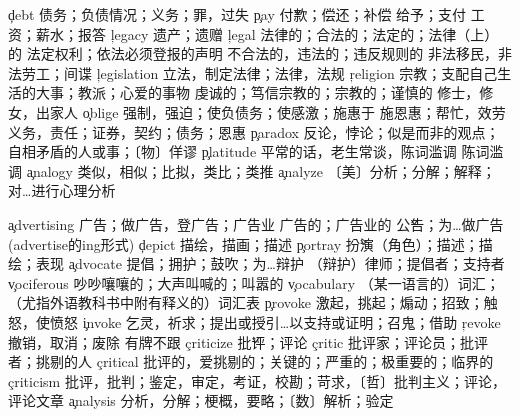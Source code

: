 \begin{multicols}{2}
\c{debt}  \n 债务；负债情况；义务；罪，过失
\c{pay}  \v 付款；偿还；补偿 \vt 给予；支付 \n 工资；薪水；报答
\c{legacy}  \n 遗产；遗赠
\c{legal}  \a 法律的；合法的；法定的；法律（上）的 \n 法定权利；依法必须登报的声明
  \a 不合法的，违法的；违反规则的 \n 非法移民，非法劳工；间谍
\c{legislation}  \n 立法，制定法律；法律，法规
\c{religion}  \n 宗教；支配自己生活的大事；教派；心爱的事物
  \a 虔诚的；笃信宗教的；宗教的；谨慎的 \n 修士，修女，出家人
\c{oblige}  \vt 强制，强迫；使负债务；使感激；施惠于 \vi 施恩惠；帮忙，效劳
  \n 义务，责任；证券，契约；债务；恩惠
\c{paradox}  \n 反论，悖论；似是而非的观点；自相矛盾的人或事；〔物〕佯谬
\c{platitude}  \n 平常的话，老生常谈，陈词滥调
  \n 陈词滥调
\c{analogy}  \n 类似，相似；比拟，类比；类推
\c{analyze}  \vt 〔美〕分析；分解；解释；对…进行心理分析


\c{advertising}  \n 广告；做广告，登广告；广告业 \a 广告的；广告业的 \v 公告；为…做广告(advertise的ing形式)
\c{depict}  \vt 描绘，描画；描述
\c{portray}  \v 扮演（角色）；描述；描绘；表现
\c{advocate}  \vt 提倡；拥护；鼓吹；为…辩护 \n （辩护）律师；提倡者；支持者
\c{vociferous}  \a 吵吵嚷嚷的；大声叫喊的；叫嚣的
\c{vocabulary}  \n （某一语言的）词汇；（尤指外语教科书中附有释义的）词汇表
\c{provoke}  \vt 激起，挑起；煽动；招致；触怒，使愤怒
\c{invoke}  \vt 乞灵，祈求；提出或授引…以支持或证明；召鬼；借助
\c{revoke}  \vt 撤销，取消；废除 \vi 有牌不跟
\c{criticize}  \v 批评；评论
\c{critic}  \n 批评家；评论员；批评者；挑剔的人
\c{critical}  \a 批评的，爱挑剔的；关键的；严重的；极重要的；临界的
\c{criticism}  \n 批评，批判；鉴定，审定，考证，校勘；苛求，〔哲〕批判主义；评论，评论文章
\c{analysis}  \n 分析，分解；梗概，要略；〔数〕解析；验定


\end{multicols}
